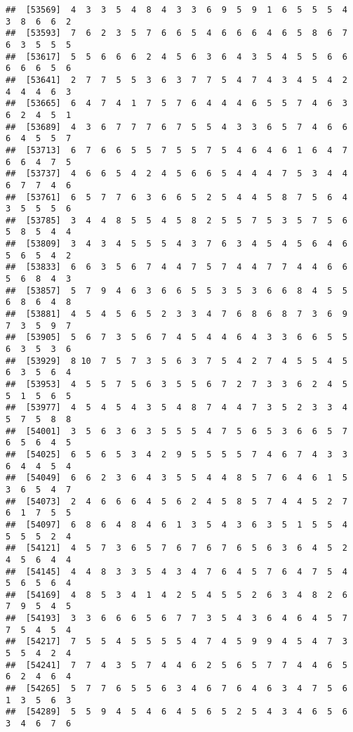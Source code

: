 \documentclass[
]{book}
\begin{document}
\begin{verbatim}
##  [53569]  4  3  3  5  4  8  4  3  3  6  9  5  9  1  6  5  5  5  4  3  8  6  6  2
##  [53593]  7  6  2  3  5  7  6  6  5  4  6  6  6  4  6  5  8  6  7  6  3  5  5  5
##  [53617]  5  5  6  6  6  2  4  5  6  3  6  4  3  5  4  5  5  6  6  6  6  6  5  6
##  [53641]  2  7  7  5  5  3  6  3  7  7  5  4  7  4  3  4  5  4  2  4  4  4  6  3
##  [53665]  6  4  7  4  1  7  5  7  6  4  4  4  6  5  5  7  4  6  3  6  2  4  5  1
##  [53689]  4  3  6  7  7  7  6  7  5  5  4  3  3  6  5  7  4  6  6  6  4  5  5  7
##  [53713]  6  7  6  6  5  5  7  5  5  7  5  4  6  4  6  1  6  4  7  6  6  4  7  5
##  [53737]  4  6  6  5  4  2  4  5  6  6  5  4  4  4  7  5  3  4  4  6  7  7  4  6
##  [53761]  6  5  7  7  6  3  6  6  5  2  5  4  4  5  8  7  5  6  4  3  5  5  5  6
##  [53785]  3  4  4  8  5  5  4  5  8  2  5  5  7  5  3  5  7  5  6  5  8  5  4  4
##  [53809]  3  4  3  4  5  5  5  4  3  7  6  3  4  5  4  5  6  4  6  5  6  5  4  2
##  [53833]  6  6  3  5  6  7  4  4  7  5  7  4  4  7  7  4  4  6  6  5  6  8  4  3
##  [53857]  5  7  9  4  6  3  6  6  5  5  3  5  3  6  6  8  4  5  5  6  8  6  4  8
##  [53881]  4  5  4  5  6  5  2  3  3  4  7  6  8  6  8  7  3  6  9  7  3  5  9  7
##  [53905]  5  6  7  3  5  6  7  4  5  4  4  6  4  3  3  6  6  5  5  6  3  5  3  6
##  [53929]  8 10  7  5  7  3  5  6  3  7  5  4  2  7  4  5  5  4  5  6  3  5  6  4
##  [53953]  4  5  5  7  5  6  3  5  5  6  7  2  7  3  3  6  2  4  5  5  1  5  6  5
##  [53977]  4  5  4  5  4  3  5  4  8  7  4  4  7  3  5  2  3  3  4  5  7  5  8  8
##  [54001]  3  5  6  3  6  3  5  5  5  4  7  5  6  5  3  6  6  5  7  6  5  6  4  5
##  [54025]  6  5  6  5  3  4  2  9  5  5  5  5  7  4  6  7  4  3  3  6  4  4  5  4
##  [54049]  6  6  2  3  6  4  3  5  5  4  4  8  5  7  6  4  6  1  5  3  6  5  4  7
##  [54073]  2  4  6  6  6  4  5  6  2  4  5  8  5  7  4  4  5  2  7  6  1  7  5  5
##  [54097]  6  8  6  4  8  4  6  1  3  5  4  3  6  3  5  1  5  5  4  5  5  5  2  4
##  [54121]  4  5  7  3  6  5  7  6  7  6  7  6  5  6  3  6  4  5  2  4  5  6  4  4
##  [54145]  4  4  8  3  3  5  4  3  4  7  6  4  5  7  6  4  7  5  4  5  6  5  6  4
##  [54169]  4  8  5  3  4  1  4  2  5  4  5  5  2  6  3  4  8  2  6  7  9  5  4  5
##  [54193]  3  3  6  6  6  5  6  7  7  3  5  4  3  6  4  6  4  5  7  7  5  4  5  4
##  [54217]  7  5  5  4  5  5  5  5  4  7  4  5  9  9  4  5  4  7  3  5  5  4  2  4
##  [54241]  7  7  4  3  5  7  4  4  6  2  5  6  5  7  7  4  4  6  5  6  2  4  6  4
##  [54265]  5  7  7  6  5  5  6  3  4  6  7  6  4  6  3  4  7  5  6  1  3  5  6  3
##  [54289]  5  5  9  4  5  4  6  4  5  6  5  2  5  4  3  4  6  5  6  3  4  6  7  6

\end{verbatim}
\end{document}
